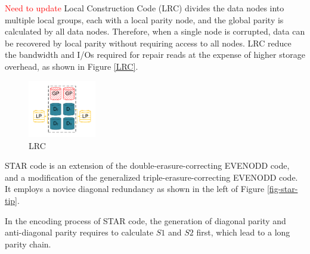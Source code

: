 \documentclass[sigconf]{acmart}
\begin{document}
\textcolor{red}{Need to update}
Local Construction Code (LRC) \cite{LRC} divides the data nodes into multiple local groups, each with a local parity node, and the global parity is calculated by all data nodes. Therefore, when a single node is corrupted, data can be recovered by local parity without requiring access to all nodes.
LRC reduce the bandwidth and I/Os required for repair reads at the expense of higher storage overhead, as shown in Figure \ref{LRC}.

\begin{figure}
    \centering
    \includegraphics[height=2.5cm]{photo/LRC.pdf}
    \caption{LRC}
\end{figure}


STAR code \cite{STAR} is an extension of the double-erasure-correcting EVENODD \cite{EVENODD} code, and a modification of the generalized triple-erasure-correcting EVENODD code. It employs a novice diagonal redundancy as shown in the left of Figure \ref{fig-star-tip}.

In the encoding process of STAR code, the generation of diagonal parity and anti-diagonal parity requires to calculate $S1$ and $S2$ first, which lead to a long parity chain.
\end{document}
